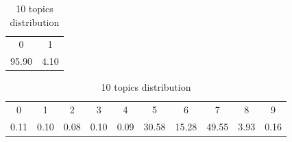 \begin{table}[!htb]
\centering

\caption{2 topics distribution}
\begin{tabular}{cc}
\\ \hline
0 & 1 \\
95.90 & 4.10 \\ \hline
\end{tabular}
\label{tab:2topicssent}

\caption{10 topics distribution
}
\begin{tabular}{cccccccccc}
\\ \hline

0 & \multicolumn{1}{c}{1} & \multicolumn{1}{c}{2} & \multicolumn{1}{c}{3} & \multicolumn{1}{c}{4} & \multicolumn{1}{c}{5} & \multicolumn{1}{c}{6} & \multicolumn{1}{c}{7} & \multicolumn{1}{c}{8} & \multicolumn{1}{c}{9} \\
0.11 & 0.10 & 0.08 & 0.10 & 0.09 & 30.58 & 15.28 & 49.55 & 3.93 & 0.16 \\ \hline
\end{tabular}
\label{tab:10topicssent}

\end{table}

